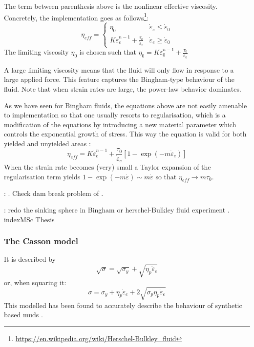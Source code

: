 The term between parenthesis above is the nonlinear effective viscosity. Concretely, the implementation goes as 
follows\footnote{\url{https://en.wikipedia.org/wiki/Herschel-Bulkley_fluid}}:
\[
\eta_{eff} = 
\left\{
\begin{array}{cc}
\eta_0 & \dot{\varepsilon}_e\leq \dot{\varepsilon}_0 \\ 
K \dot{\varepsilon}_e^{n-1} + \frac{\tau_0}{\dot{\varepsilon}_e} & \dot{\varepsilon}_e \geq \dot{\varepsilon}_0
\end{array}
\right.
\]
The limiting viscosity $\eta_0$ is chosen such that 
$\eta_0 =  K \dot{\varepsilon}_0^{n-1} + \frac{\tau_0}{\dot{\varepsilon}_0}$

A large limiting viscosity means that the fluid will only flow in response to a large applied force. 
This feature captures the Bingham-type behaviour of the fluid. 
Note that when strain rates are large, the power-law behavior dominates. 

As we have seen for Bingham fluids, the equations above are not easily amenable to implementation so that 
one usually resorts to regularisation, which is a modification of the 
equations by introducing a new material parameter which controls the exponential 
growth of stress. This way the equation is valid for both yielded and unyielded areas
\cite{blmi97,papa87,zifr07}:
\begin{equation}
\eta_{eff} = K \dot{\varepsilon}_e^{n-1} + \frac{\tau_0}{\dot{\varepsilon}_e} [1 - \exp(-m \dot{\varepsilon}_e)] 
\end{equation}
When the strain rate becomes (very) small a Taylor expansion of the regularisation 
term yields $1- \exp(-m \dot{\varepsilon}) \sim m \dot{\varepsilon} $ so that 
$\eta_{eff} \rightarrow m \tau_0$.


\Literature: \cite{madd13}. Check dam break problem of \cite{anco09,coan09,bafp09,tagm09,miga09}.


\mscthesis: redo the sinking sphere in Bingham or herschel-Bulkley fluid experiment \cite{bemj04}. index{MSc Thesis}

\subsubsection{The Casson model}

It is described by \cite{barn99} 
\[
\sqrt{\sigma} = \sqrt{\sigma_y} + \sqrt{\eta_p \dot{\varepsilon}_e} 
\]
or, when squaring it:
\[
\sigma = \sigma_y + \eta_p \dot{\varepsilon}_e + 2\sqrt{\sigma_p \eta_p \dot{\varepsilon}_e} 
\]
This modelled has been found to accurately describe the behaviour of synthetic based muds \cite{adlo17}. 

